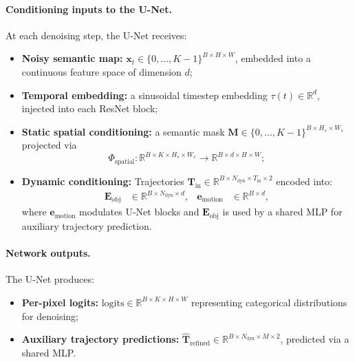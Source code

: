 \documentclass{article}
\begin{document}
\paragraph{Conditioning inputs to the U-Net.}
At each denoising step, the U-Net receives:
\begin{itemize}
  \item \textbf{Noisy semantic map:} $\mathbf{x}_t \in \{0,\ldots,K{-}1\}^{B\times H\times W}$, embedded into a continuous feature space of dimension $d$;
  \item \textbf{Temporal embedding:} a sinusoidal timestep embedding $\tau(t)\in\mathbb{R}^d$, injected into each ResNet block;
  \item \textbf{Static spatial conditioning:} a semantic mask $\mathbf{M}\in\{0,\dots,K{-}1\}^{B\times H_s\times W_s}$ projected via
  \[
    \Phi_{\text{spatial}}:\mathbb{R}^{B\times K\times H_s\times W_s} \to \mathbb{R}^{B\times d\times H\times W};
  \]
  \item \textbf{Dynamic conditioning:} Trajectories 
  $\mathbf{T}_{\text{in}}\in\mathbb{R}^{B\times N_{\text{dyn}}\times T_{\text{in}}\times 2}$ encoded into:
  \begin{align*}
    \mathbf{E}_{\text{obj}} &\in \mathbb{R}^{B\times N_{\text{dyn}}\times d}, &
    \mathbf{e}_{\text{motion}} &\in \mathbb{R}^{B\times d},
  \end{align*}
  where $\mathbf{e}_{\text{motion}}$ modulates U-Net blocks and $\mathbf{E}_{\text{obj}}$ is used by a shared MLP for auxiliary trajectory prediction.
\end{itemize}

\paragraph{Network outputs.}
The U-Net produces:
\begin{itemize}
  \item \textbf{Per-pixel logits:} $\mathrm{logits}\in\mathbb{R}^{B\times K\times H\times W}$ representing categorical distributions for denoising;
  \item \textbf{Auxiliary trajectory predictions:}
  $\widehat{\mathbf{T}}_{\text{refined}}\in\mathbb{R}^{B\times N_{\text{dyn}}\times M\times 2}$, predicted via a shared MLP.
\end{itemize}
\end{document}
